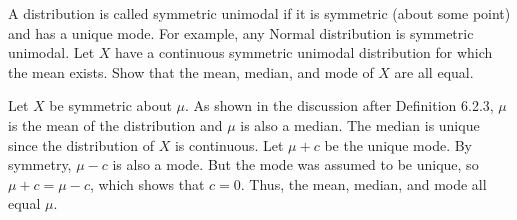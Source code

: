 
\setcounter{theorem}{9}
\begin{exercise} [BH.6.10]
    A distribution is called symmetric unimodal if it is symmetric (about some point) and has a unique mode. For example, any Normal distribution is symmetric unimodal. Let $X$ have a continuous symmetric unimodal distribution for which the mean exists. Show that the mean, median, and mode of $X$ are all equal.
\begin{solution}
    Let $X$ be symmetric about $\mu$. As shown in the discussion after Definition 6.2.3, $\mu$ is the mean of the distribution and $\mu$ is also a median. The median is unique since the distribution of $X$ is continuous. Let $\mu+c$ be the unique mode. By symmetry, $\mu-c$ is also a mode. But the mode was assumed to be unique, so $\mu+c=\mu-c$, which shows that $c=0$. Thus, the mean, median, and mode all equal $\mu$.
	
\end{solution}
\end{exercise}

